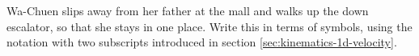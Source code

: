 Wa-Chuen slips away from her father at the mall and walks
up the down escalator, so that she stays in one place. Write
this in terms of symbols, using the notation with two subscripts
introduced in section \ref{sec:kinematics-1d-velocity}.
